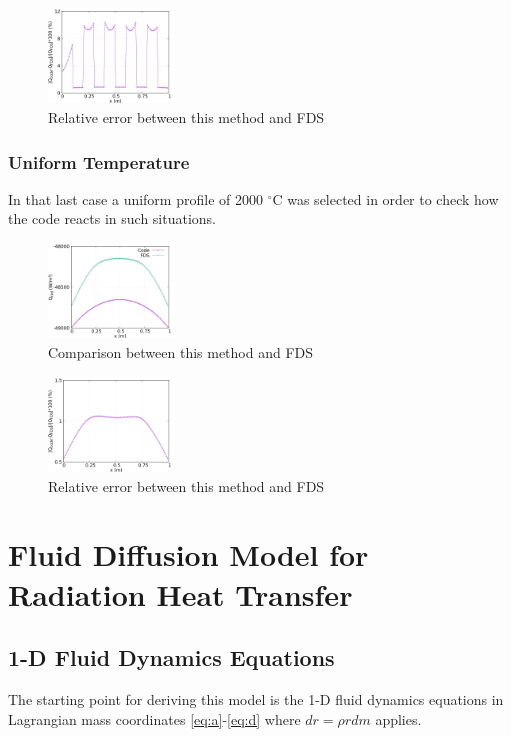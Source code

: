 \documentclass{warpdoc}
\begin{document}
\begin{figure}[!h]
\centering
\includegraphics[width=0.3\textwidth]{2000-20mult_err.png}
\caption{Relative error between this method and FDS}
\label{fig:steprelerr2}
\end{figure}

\subsubsection{Uniform Temperature}
In that last case a uniform profile of 2000 $^\circ$C was selected in order to check how the code reacts in such situations.
\begin{figure}[!h]
\centering
\includegraphics[width=0.3\textwidth]{2000.png}
\caption{Comparison between this method and FDS}
\label{fig:unif}
\end{figure}

\begin{figure}[!h]
\centering
\includegraphics[width=0.3\textwidth]{2000_err.png}
\caption{Relative error between this method and FDS}
\label{fig:unifrelerr}
\end{figure}


\section{Fluid Diffusion Model for Radiation Heat Transfer}
\subsection{1-D Fluid Dynamics Equations}
The starting point for deriving this model is the 1-D fluid dynamics equations in Lagrangian mass coordinates \eqref{eq:a}-\eqref{eq:d} where $dr=\rho rdm$ applies. 
\end{document}
